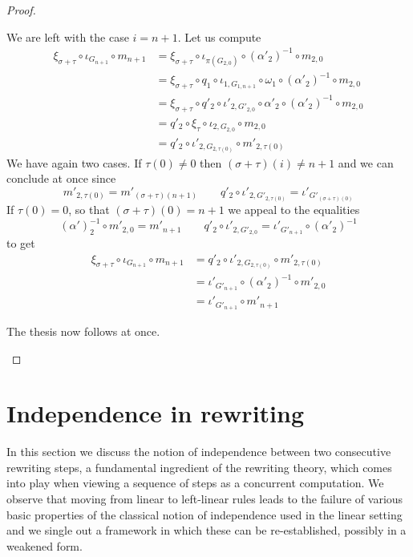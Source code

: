 \documentclass[a4paper,UKenglish,cleveref,pdftex,thm-restate,numberwithinsect]{lipics-v2021}
\begin{document}
\begin{proof}
\begin{itemize}
\begin{itemize}
      We are left with the case $i=n+1$. Let us compute
      \begin{align*}
        \xi_{\sigma+\tau}\circ \iota_{G_{n+1}} \circ m_{n+1} & = \xi_{\sigma+\tau} \circ \iota_{\pi(G_{2,0})} \circ (\alpha'_2)^{-1}\circ m_{2,0} \\&=\xi_{\sigma+\tau} \circ q_1\circ \iota_{1, G_{1,n+1}} \circ \omega_1 \circ (\alpha'_2)^{-1}\circ m_{2,0}\\&=\xi_{\sigma+\tau} \circ q'_2 \circ \iota'_{2,G'_{2,0}} \circ \alpha'_2 \circ (\alpha'_2)^{-1}\circ m_{2,0} \\&=q'_2 \circ \xi_\tau \circ \iota_{2, G_{2,0}} \circ m_{2,0}\\&=q'_2\circ \iota'_{2, G_{2,\tau(0)}} \circ m'_{2,\tau(0)}
      \end{align*}
      We have again two cases. If $\tau(0)\neq 0$ then $(\sigma+\tau)(i)\neq n+1$ and we can conclude at once since
      \[m'_{2, \tau(0)}=m'_{(\sigma+\tau)(n+1)} \qquad q'_2\circ \iota'_{2, G'_{2,\tau(0)}}=
        \iota'_{G'_{(\sigma+\tau)(0)}}\]
      If $\tau(0)=0$, so that  $(\sigma+\tau)(0)= n+1$ we appeal to the equalities
      \[(\alpha')^{-1}_2\circ m'_{2, 0}=m'_{n+1} \qquad q'_2\circ \iota'_{2, G'_{2, 0}}=
        \iota'_{G'_{n+1}}\circ (\alpha'_2)^{-1}\]
      to get
      \begin{align*}
        \xi_{\sigma+\tau}\circ \iota_{G_{n+1}} \circ m_{n+1} & = q'_2\circ \iota'_{2, G_{2,\tau(0)}} \circ m'_{2,\tau(0)} \\&=	\iota'_{G'_{n+1}}\circ (\alpha'_2)^{-1}\circ m'_{2,0}\\&=\iota'_{G'_{n+1}}\circ  m'_{n+1}
      \end{align*}
    \end{itemize}
    The thesis now follows at once.	 \qedhere
  \end{itemize} \end{proof}
\fi




\section{Independence in rewriting}
\label{sec:equi}

In this section we discuss the notion of independence between two
consecutive rewriting steps, a fundamental ingredient of the rewriting
theory, which comes into play when viewing a sequence of steps as a
concurrent computation. We observe that moving from linear to
left-linear rules leads to the failure of various basic properties of
the classical notion of independence used in the linear setting and we
single out a framework in which these can be re-established, possibly
in a weakened form.
\end{document}
